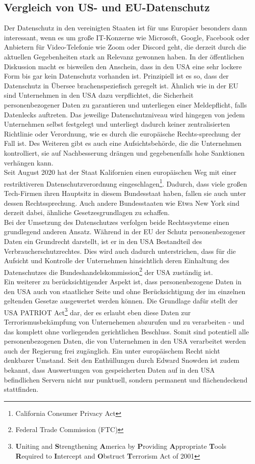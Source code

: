 \subsection{Vergleich von US- und EU-Datenschutz}
    Der Datenschutz in den vereinigten Staaten ist für uns Europäer besonders dann interessant, wenn es um große IT-Konzerne wie Microsoft, Google, Facebook oder Anbietern für Video-Telefonie wie Zoom oder Discord geht, die derzeit durch die aktuellen Gegebenheiten stark an Relevanz gewonnen haben. In der öffentlichen Diskussion macht es bisweilen den Anschein, dass in den USA eine sehr lockere Form bis gar kein Datenschutz vorhanden ist. Prinzipiell ist es so, dass der Datenschutz in Übersee brachenspeziefisch geregelt ist. Ähnlich wie in der EU sind Unternehmen in den USA dazu verpflichtet, die Sicherheit personenbezogener Daten zu garantieren und unterliegen einer Meldepflicht, falls Datenlecks auftreten. Das jeweilige Datenschutzniveau wird hingegen von jedem Unternehmen selbst festgelegt und unterliegt dadurch keiner zentralisierten Richtlinie oder Verordnung, wie es durch die europäische Rechts-sprechung der Fall ist. Des Weiteren gibt es auch eine Aufsichtsbehörde, die die Unternehmen kontrolliert, sie auf Nachbesserung drängen und gegebenenfalls hohe Sanktionen verhängen kann.\\
    Seit August 2020 hat der Staat Kalifornien einen \glqq europäischen Weg\grqq{} mit einer restriktiveren Datenschutzverordnung eingeschlagen\footnote{California Consumer Privacy Act}. Dadurch, dass viele großen Tech-Firmen ihren Hauptsitz in diesem Bundesstaat haben, fallen sie auch unter dessen Rechtssprechung. Auch andere Bundesstaaten wie Etwa New York sind derzeit dabei, ähnliche Gesetzesgrundlagen zu schaffen.\\
    Bei der Umsetzung des Datenschutzes verfolgen beide Rechtssysteme einen grundlegend anderen Ansatz. Während in der EU der Schutz personenbezogener Daten ein Grundrecht darstellt, ist er in den USA Bestandteil des Verbraucherschutzrechtes. Dies wird auch dadurch unterstrichen, dass für die Aufsicht und Kontrolle der Unternehmen hinsichtlich deren Einhaltung des Datenschutzes die Bundeshandelskommission\footnote{Federal Trade Commission (FTC)} der USA zuständig ist.\\
    Ein weiterer zu berücksichtigender Aspekt ist, dass personenbezogene Daten in den USA auch von staatlicher Seite und ohne Berücksichtigung der im einzelnen geltenden Gesetze ausgewertet werden können. Die Grundlage dafür stellt der \glqq USA PATRIOT Act\grqq{}\footnote{\textbf{U}niting and \textbf{S}trengthening \textbf{A}merica by \textbf{P}roviding \textbf{A}ppropriate \textbf{T}ools \textbf{R}equired to \textbf{I}ntercept and \textbf{O}bstruct \textbf{T}errorism Act of 2001} dar, der es erlaubt eben diese Daten zur Terrorismusbekämpfung von Unternehemen abzurufen und zu verarbeiten - und das komplett ohne vorliegenden gerichtlichen Beschluss. Somit sind potentiell alle personenbezogenen Daten, die von Unternehmen in den USA verarbeitet werden auch der Regierung frei zugänglich. Ein unter europäischem Recht nicht denkbarer Umstand. Seit den Enthüllungen durch Edward Snowden ist zudem bekannt, dass Auswertungen von gespeicherten Daten auf in den USA befindlichen Servern nicht nur punktuell, sondern permanent und flächendeckend stattfinden.
